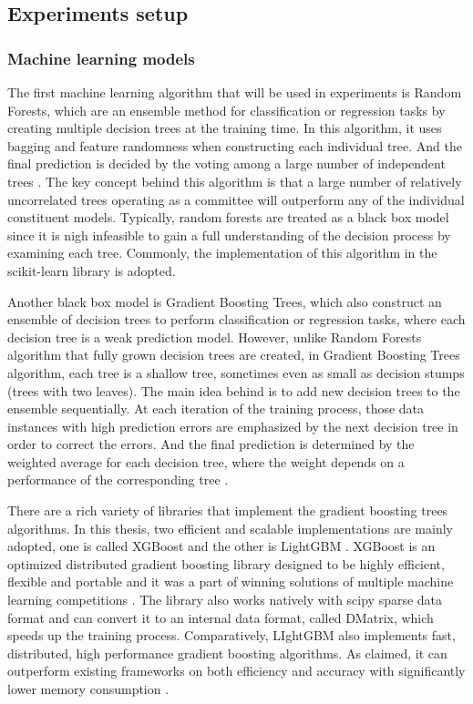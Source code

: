 \subsection{Experiments setup}


\subsubsection{Machine learning models}

The first machine learning algorithm that will be used in experiments is Random Forests, which are an ensemble method for classification or regression tasks by creating multiple decision trees at the training time. In this algorithm, it uses bagging and feature randomness when constructing each individual tree. And the final prediction is decided by the voting among a large number of independent trees \cite{breiman2001random}. The key concept behind this algorithm is that a large number of relatively uncorrelated trees operating as a committee will outperform any of the individual constituent models. Typically, random forests are treated as a black box model since it is nigh infeasible to gain a full understanding of the decision process by examining each tree. Commonly, the implementation of this algorithm in the scikit-learn library is adopted. 

Another black box model is Gradient Boosting Trees, which also construct an ensemble of decision trees to perform classification or regression tasks, where each decision tree is a weak prediction model. However, unlike Random Forests algorithm that fully grown decision trees are created, in Gradient Boosting Trees algorithm, each tree is a shallow tree, sometimes even as small as decision stumps (trees with two leaves). The main idea behind is to add new decision trees to the ensemble sequentially. At each iteration of the training process, those data instances with high prediction errors are emphasized by the next decision tree in order to correct the errors. And the final prediction is determined by the weighted average for each decision tree, where the weight depends on a performance of the corresponding tree \cite{natekin2013gradient}. 

There are a rich variety of libraries that implement the gradient boosting trees algorithms. In this thesis, two efficient and scalable implementations are mainly adopted, one is called XGBoost \cite{chen2016xgboost} and the other is LightGBM \cite{ke2017lightgbm}. XGBoost is an optimized distributed gradient boosting library designed to be highly efficient, flexible and portable and it was a part of winning solutions of multiple machine learning competitions \cite{xgboost}. The library also works natively with scipy sparse data format and can convert it to an internal data format, called DMatrix, which speeds up the training process. Comparatively, LIghtGBM also implements fast, distributed, high performance gradient boosting algorithms. As claimed, it can outperform existing frameworks on both efficiency and accuracy with significantly lower memory consumption \cite{lightgbm}. 


